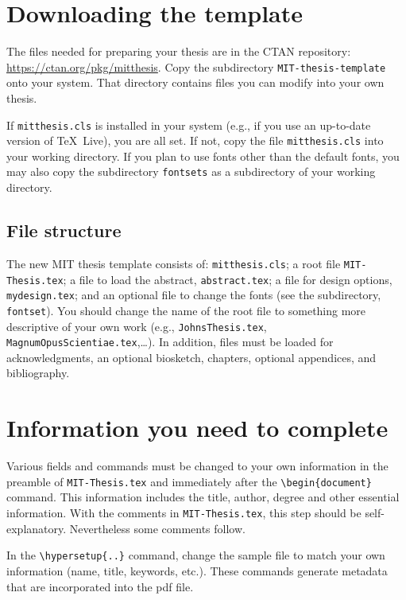 \documentclass[11pt]{article}
\begin{document}
\section*{Downloading the template}
The files needed for preparing your thesis are in the CTAN repository: \url{https://ctan.org/pkg/mitthesis}. Copy the subdirectory \texttt{MIT-thesis-template} onto your system. That directory contains files you can modify into your own thesis. 

If \texttt{mitthesis.cls} is installed in your system (e.g., if you use an up-to-date version of \TeX\ Live), you are all set.  If not, copy the file \texttt{mitthesis.cls} into your working directory. If you plan to use fonts other than the default fonts, you may also copy the subdirectory \texttt{fontsets} as a subdirectory of your working directory.

\subsection*{File structure}
The new MIT thesis template consists of: \texttt{mitthesis.cls}; a root file \texttt{MIT-Thesis.tex}; a file to load the abstract, \texttt{abstract.tex}; a file for design options, \texttt{mydesign.tex}; and an optional file to change the fonts (see the subdirectory, \texttt{fontset}). You should change the name of the root file to something more descriptive of your own work (e.g., \texttt{JohnsThesis.tex}, \texttt{MagnumOpusScientiae.tex},\ldots). In addition, files must be loaded for acknowledgments, an optional biosketch, chapters, optional appendices, and bibliography.

\section*{Information you need to complete}
Various fields and commands must be changed to your own information in the preamble of \texttt{MIT-Thesis.tex} and immediately after the \verb|\begin{document}| command. This information includes the title, author, degree and other essential information.  With the comments in \texttt{MIT-Thesis.tex}, this step should be self-explanatory. Nevertheless some comments follow.

In the \verb|\hypersetup{..}| command, change the sample file to match your own information (name, title, keywords, etc.). These commands generate metadata that are incorporated into the pdf file.  
\end{document}
